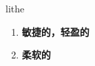 
\begin{frame}
{\huge lithe}
\begin{center}
\begin{enumerate}\Large
  \item \textbf{敏捷的，轻盈的}
  \item \textbf{柔软的}
\end{enumerate}
\end{center}
\end{frame}
